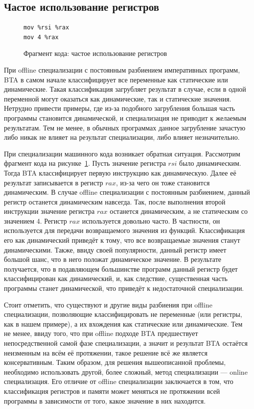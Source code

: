 \subsection{Частое использование регистров}
\label{part:4.1}

\begin{figure}
\begin{lstlisting}[xleftmargin = 20pt]
mov %rsi %rax
mov 4 %rax
\end{lstlisting}
\caption{Фрагмент кода: частое использование регистров}
\label{fig:reg}
\end{figure}

При offline специализации с постоянным разбиением императивных программ, BTA в самом начале классифицирует все переменные
как статические или динамические.
Такая классификация загрубляет результат в случае, если в одной переменной могут оказаться как динамические, так и статические значения.
Нетрудно привести примеры, где из-за подобного загрубления большая часть программы становится динамической,
и специализация не приводит к желаемым результатам.
Тем не менее, в обычных программах данное загрубление зачастую либо никак не влияет на результат специализации, либо влияет незначительно.

При специализации машинного кода возникает обратная ситуация. Рассмотрим фрагмент кода на рисунке~\ref{fig:reg}. Пусть значение регистра $rsi$ было динамическим. Тогда BTA классифицирует первую инструкцию как динамическую. Далее её результат записывается в регистр $rax$, из-за чего он тоже становится динамическим. В случае offline специализации с постоянным разбиением, данный регистр останется динамическим навсегда. Так, после выполнения второй инструкции значение регистра $rax$ останется динамическим, а не статическим со значением 4. Регистр $rax$ используется довольно часто. В частности, он используется для передачи возвращаемого значения из функций. Классификация его как динамический приведёт к тому, что все возвращаемые значения станут динамическими. Также, ввиду своей популярности, данный регистр имеет большой шанс, что в него положат динамическое значение. В результате получается, что в подавляющем большинстве программ данный регистр будет классифицирован как динамический,
и, как следствие, существенная часть программы станет динамической, что приведёт к недостаточной специализации.

Стоит отметить, что существуют и другие виды разбиения при offline специализации, позволяющие классифицировать
не переменные (или регистры, как в нашем примере), а их вхождения как статические или динамические.
Тем не менее, ввиду того, что при offline подходе BTA предшествует непосредственной самой фазе специализации,
а значит и результат BTA остаётся неизменным на всём её протяжении,
такое решение всё же является консервативным.
Таким образом, для решения вышеописанной проблемы, необходимо использовать другой, более сложный, метод специализации --- online специализация. Его отличие от offline специализации заключается в том, что классификация регистров и памяти может меняться не протяжении всей программы в зависимости от того, какое значение в них находится.

